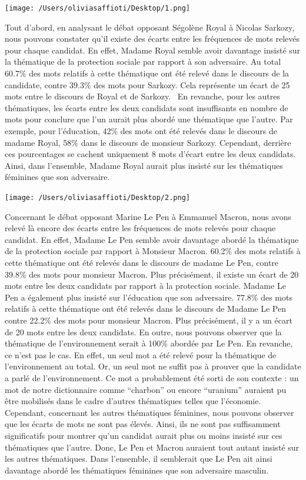 \documentclass[
  letterpaper,
  DIV=11,
  numbers=noendperiod]{scrartcl}
\begin{document}
\texttt{[image: /Users/oliviasaffioti/Desktop/1.png]}

Tout d'abord, en analysant le débat opposant Ségolène Royal à Nicolas
Sarkozy, nous pouvons constater qu'il existe des écarts entre les
fréquences de mots relevés pour chaque candidat. En effet, Madame Royal
semble avoir davantage insisté sur la thématique de la protection
sociale par rapport à son adversaire. Au total 60.7\% des mots relatifs
à cette thématique ont été relevé dans le discours de la candidate,
contre 39.3\% des mots pour Sarkozy. Cela représente un écart de 25 mots
entre le discours de Royal et de Sarkozy.~ En revanche, pour les autres
thématiques, les écarts entre les deux candidats sont insuffisants en
nombre de mots pour conclure que l'un aurait plus abordé une thématique
que l'autre. Par exemple, pour l'éducation, 42\% des mots ont été
relevés dans le discours de madame Royal, 58\% dans le discours de
monsieur Sarkozy. Cependant, derrière ces pourcentages se cachent
uniquement 8 mots d'écart entre les deux candidats. Ainsi, dans
l'ensemble, Madame Royal aurait plus insisté sur les thématiques
féminines que son adversaire.~

\texttt{[image: /Users/oliviasaffioti/Desktop/2.png]}

Concernant le débat opposant Marine Le Pen à Emmanuel Macron, nous avons
relevé là encore des écarts entre les fréquences de mots relevés pour
chaque candidat. En effet, Madame Le Pen semble avoir davantage abordé
la thématique de la protection sociale par rapport à Monsieur Macron.
60.2\% des mots relatifs à cette thématique ont été relevés dans le
discours de madame Le Pen, contre 39.8\% des mots pour monsieur Macron.
Plus précisément, il existe un écart de 20 mots entre les deux candidats
par rapport à la protection sociale. Madame Le Pen a également plus
insisté sur l'éducation que son adversaire. 77.8\% des mots relatifs à
cette thématique ont été relevés dans le discours de Madame Le Pen
contre 22.2\% des mots pour monsieur Macron. Plus précisément, il y a un
écart de 20 mots entre les deux candidats. En outre, nous pouvons
observer que la thématique de l'environnement serait à 100\% abordée par
Le Pen. En revanche, ce n'est pas le cas. En effet, un seul mot a été
relevé pour la thématique de l'environnement au total. Or, un seul mot
ne suffit pas à prouver que la candidate a parlé de l'environnement. Ce
mot a probablement été sorti de son contexte : un mot de notre
dictionnaire comme ``charbon'' ou encore ``uranium'' auraient pu être
mobilisés dans le cadre d'autres thématiques telles que l'économie.
Cependant, concernant les autres thématiques féminines, nous pouvons
observer que les écarts de mots ne sont pas élevés. Ainsi, ils ne sont
pas suffisamment significatifs pour montrer qu'un candidat aurait plus
ou moins insisté sur ces thématiques que l'autre. Donc, Le Pen et Macron
auraient tout autant insisté sur les autres thématiques. Dans
l'ensemble, il semblerait que Le Pen ait ainsi davantage abordé les
thématiques féminines que son adversaire masculin.~
\end{document}
